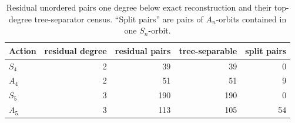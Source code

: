 \begin{table}[htbp]
\centering
\caption{Residual unordered pairs one degree below exact reconstruction and
their top-degree tree-separator census.  ``Split pairs'' are pairs of
$A_n$-orbits contained in one $S_n$-orbit.}
\label{tab:collision-tree}
\begin{tabular}{lrrrr}
\toprule
Action & residual degree & residual pairs & tree-separable & split pairs\\
\midrule
$S_4$ & 2 & 39 & 39 & 0\\
$A_4$ & 2 & 51 & 51 & 9\\
$S_5$ & 3 & 190 & 190 & 0\\
$A_5$ & 3 & 113 & 105 & 54\\
\bottomrule
\end{tabular}
\end{table}
